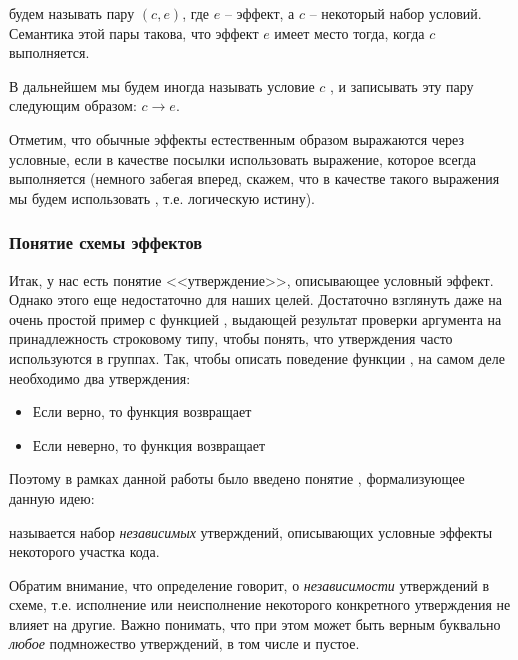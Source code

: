 \begin{definition}
    \label{def-cond-effect}
     будем называть пару $(c, e)$, где $e$ -- эффект, а $c$ -- некоторый набор условий. Семантика этой пары такова, что эффект $e$ имеет место тогда, когда $c$ выполняется.  
    
    В дальнейшем мы будем иногда называть условие $c$ , и записывать эту пару следующим образом: $c \to e$.
   
\end{definition}

Отметим, что обычные эффекты естественным образом выражаются через условные, если в качестве посылки использовать выражение, которое всегда выполняется (немного забегая вперед, скажем, что в качестве такого выражения мы будем использовать , т.е. логическую истину).



\subsubsection{Понятие схемы эффектов}


Итак, у нас есть понятие <<утверждение>>, описывающее условный эффект. Однако этого еще недостаточно для наших целей. Достаточно взглянуть даже на очень простой пример с функцией , выдающей результат проверки аргумента на принадлежность строковому типу, чтобы понять, что утверждения часто используются в группах. Так, чтобы описать поведение функции , на самом деле необходимо два утверждения:

\begin{itemize}
    \item Если  верно, то функция возвращает 
    
    \item Если  неверно, то функция возвращает 
\end{itemize}

Поэтому в рамках данной работы было введено понятие , формализующее данную идею:

\begin{definition}
     называется набор \emph{независимых} утверждений, описывающих условные эффекты некоторого участка кода.
\end{definition}

Обратим внимание, что определение говорит, о \emph{независимости} утверждений в схеме, т.е. исполнение или неисполнение некоторого конкретного утверждения не влияет на другие. Важно понимать, что при этом может быть верным буквально \emph{любое} подмножество утверждений, в том числе и пустое.

